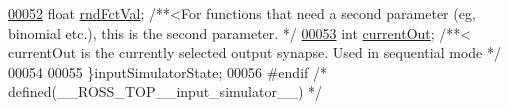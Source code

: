\begin{DoxyCode}
\hypertarget{input__simulator_8h_source_l00052}{}\hyperlink{structinput_simulator_state_a0eb8199754a403ccc8eac256f9193a02}{00052}     \textcolor{keywordtype}{float} \hyperlink{structinput_simulator_state_a0eb8199754a403ccc8eac256f9193a02}{rndFctVal}; \textcolor{comment}{/**<For functions that need a second parameter (eg, binomial etc.),
       this is the second parameter. */}
\hypertarget{input__simulator_8h_source_l00053}{}\hyperlink{structinput_simulator_state_accc0c3f890194cda401a16f5f54e43cb}{00053}     \textcolor{keywordtype}{int} \hyperlink{structinput_simulator_state_accc0c3f890194cda401a16f5f54e43cb}{currentOut}; \textcolor{comment}{/**< currentOut is the currently selected output synapse. Used in
       sequential mode */}
00054 
00055 \}inputSimulatorState;
00056 \textcolor{preprocessor}{#}\textcolor{preprocessor}{endif} \textcolor{comment}{/* defined(\_\_ROSS\_TOP\_\_input\_simulator\_\_) */}
\end{DoxyCode}
